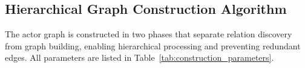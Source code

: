 
\subsection{Hierarchical Graph Construction Algorithm}
\label{subsec:construction_algorithm}

The actor graph is constructed in two phases that separate relation discovery from graph building, enabling hierarchical processing and preventing redundant edges. All parameters are listed in Table~\ref{tab:construction_parameters}.


